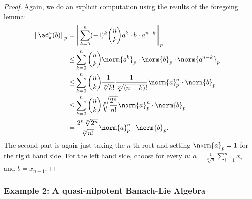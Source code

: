\documentclass[
11pt,                          %
english                        %
]{article}
\begin{document}
\begin{proof}
	Again, we do an explicit computation using the results of the foregoing lemma:
	\begin{align*}
		\left\Vert
			\ad_a^n(b)
		\right\Vert_p
		&=
		\left\Vert
			\sum\limits_{k = 0}^n
			(-1)^k
			\binom{n}{k}
			a^k
			\cdot b \cdot
			a^{n - k}
		\right\Vert_p
		\\
		& \leq
		\sum\limits_{k = 0}^n
		\binom{n}{k}
		\norm{a^k}_p
		\cdot \norm{b}_p \cdot
		\norm{a^{n - k}}_p
		\\
		& \leq
		\sum\limits_{k = 0}^n
		\binom{n}{k}
		\frac{1}{\sqrt[p]{k!}}
		\frac{1}{\sqrt[p]{(n - k)!}}
		\norm{a}_p^n
		\cdot \norm{b}_p
		\\
		& \leq
		\sum\limits_{k = 0}^n
		\binom{n}{k}
		\sqrt[p]{\frac{2^n}{n!}}		
		\norm{a}_p^n
		\cdot \norm{b}_p
		\\
		& =
		\frac{2^n \sqrt[p]{2^n}}{\sqrt[p]{n!}}		
		\norm{a}_p^n
		\cdot \norm{b}_p.
	\end{align*}
	The second part is again just taking the $n$-th root and setting 
	$\norm{a}_p = 1$ for the right hand side. For the left hand side, choose
	for every $n$: $a = \frac{1}{\sqrt[p]{n}} \sum_{i=1}^n x_i$ and $b = x_{n+1}$.
\end{proof}



\subsubsection{Example 2: A quasi-nilpotent Banach-Lie Algebra}
\end{document}
